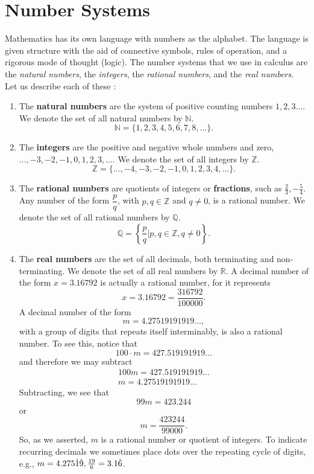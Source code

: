 \documentclass[titlepage,a4paper,12pt]{report}
\begin{document}
\section{Number Systems}
Mathematics has its own language with numbers as the alphabet. The language is given structure
with the aid of connective symbols, rules of operation, and a rigorous mode of thought (logic). The number systems that we use in calculus are the \textit{natural numbers}, the \textit{integers}, the \textit{rational numbers}, and the \textit{real numbers}. Let us describe each of these :
\begin{enumerate}
\item  The \textbf{natural numbers} are the system of positive counting numbers $1,2,3\dots .$ We denote the set of all natural numbers by $\mathbb{N}$.
\[\mathbb{N}=\{1,2,3,4,5,6,7,8,\dots\}.\]
\item The \textbf{integers} are the positive and negative whole numbers and zero, $\dots ,-3,-2,-1,0,1,2,3,\dots .$ We denote the set of all integers by $\mathbb{Z}$.
\[\mathbb{Z}=\{\dots, -4,-3,-2,-1,0,1,2,3,4,\dots\}.\]
\item The \textbf{rational numbers} are quotients of integers or \textbf{fractions}, such as $\frac{2}{3}, -\frac{5}{4}$. Any number of the form $\dfrac{p}{q}$, with $p,q \in \mathbb{Z}$ and $q\neq 0$, is a rational number. We denote the set of all rational numbers by $\mathbb{Q}$.
\[\mathbb{Q}=\left\{\dfrac{p}{q}\biggl|p,q\in \mathbb{Z}, q\neq 0\right\}.\]
\item The \textbf{real numbers} are the set of all decimals, both terminating and non-terminating. We denote the set of all real numbers by $\mathbb{R}$. A decimal number of the form $x=3.16792$ is actually a rational number, for it represents 
\begin{equation*}
x=3.16792=\dfrac{316792}{100000}.
\end{equation*}
A decimal number of the form 
\begin{equation*}
m=4.27519191919\dots ,
\end{equation*}
with a group of digits that repeats itself interminably, is also a rational number.
To see this, notice that 
\begin{equation*}
100\cdot m=427.519191919\dots 
\end{equation*}  
and therefore we may subtract
\begin{eqnarray*}
100m=427.519191919\dots \\
m=4.27519191919\dots
\end{eqnarray*}
Subtracting, we see that 
\begin{equation*}
99m=423.244
\end{equation*}
or 
\begin{equation*}
m=\dfrac{423244}{99000}.
\end{equation*}
So, as we asserted, $m$ is a rational number  or quotient of integers. To  indicate recurring decimals we sometimes place dots over the repeating cycle of digits, e.g., $m=4.275\dot{1}\dot{9},\\ \frac{19}{6}=3.1\dot{6}$.


\end{enumerate}
\end{document}
